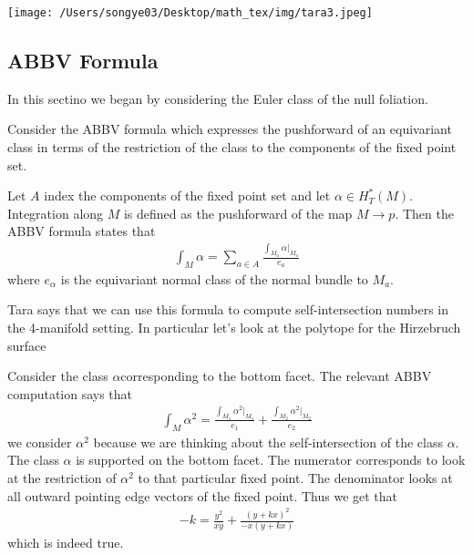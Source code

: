 \documentclass[12pt]{article}
\begin{document}
\hfill

\begin{center}
	\texttt{[image: /Users/songye03/Desktop/math\_tex/img/tara3.jpeg]}
\end{center}


\subsection{ABBV Formula}
In this sectino we began by considering the Euler class of the null foliation.


Consider the ABBV formula which expresses the pushforward of an equivariant class in terms
of the restriction of the class to the components of the fixed point set.

\hfill

Let $A$ index the components of the fixed point set and let $\alpha \in H_T^*(M)$. Integration
along $M$ is defined as the pushforward of the map $M\to p$. Then the ABBV formula states that
\begin{align*}
	\int_M \alpha = \sum_{a\in A} \frac{\int_{M_a}\alpha\vert_{M_a}}{e_a}
\end{align*} where $e_\alpha$ is the equivariant normal
class of the normal bundle to $M_a$.

\hfill

Tara says that we can use this formula to compute self-intersection numbers
in the 4-manifold setting. In particular let's look at the
polytope for the Hirzebruch surface

\begin{center}
\end{center}

Consider the class $\alpha$corresponding to the bottom facet. The relevant ABBV computation says that \begin{align*}
	\int_M \alpha^2 = \frac{\int_{M_1}\alpha^2\vert_{M_1}}{e_1} + \frac{\int_{M_2}\alpha^2\vert_{M_2}}{e_2}
\end{align*} we consider $\alpha^2$ because we are thinking about
the self-intersection of the class $\alpha$. The class $\alpha$ is supported on the bottom facet.
The numerator corresponds to look at the restriction of $\alpha^2$ to that particular fixed point.
The denominator looks at all outward pointing edge vectors of the fixed point.
Thus we get that \begin{align*}
	-k = \frac{y^2}{xy} + \frac{(y+kx)^2}{-x(y+kx)}
\end{align*} which is indeed true.
\end{document}
